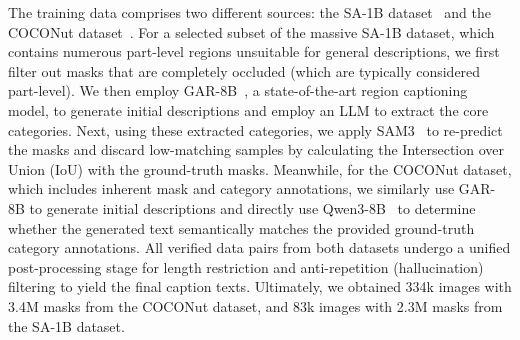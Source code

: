 The training data comprises two different sources: the SA-1B dataset~\citep{kirillov2023segment} and the COCONut dataset~\citep{deng2024coconut}. For a selected subset of the massive SA-1B dataset, which contains numerous part-level regions unsuitable for general descriptions, we first filter out masks that are completely occluded (which are typically considered part-level). 
%
We then employ GAR-8B~\citep{wang2025grasp}, a state-of-the-art region captioning model, to generate initial descriptions and employ an LLM to extract the core categories. 
%
Next, using these extracted categories, we apply SAM3~\citep{carion2025sam} to re-predict the masks and discard low-matching samples by calculating the Intersection over Union (IoU) with the ground-truth masks. 
%
Meanwhile, for the COCONut dataset, which includes inherent mask and category annotations, we similarly use GAR-8B to generate initial descriptions and directly use Qwen3-8B~\citep{yang2025qwen3} to determine whether the generated text semantically matches the provided ground-truth category annotations.
%
All verified data pairs from both datasets undergo a unified post-processing stage for length restriction and anti-repetition (hallucination) filtering to yield the final caption texts. Ultimately, we obtained 334k images with 3.4M masks from the COCONut dataset, and 83k images with 2.3M masks from the SA-1B dataset. 